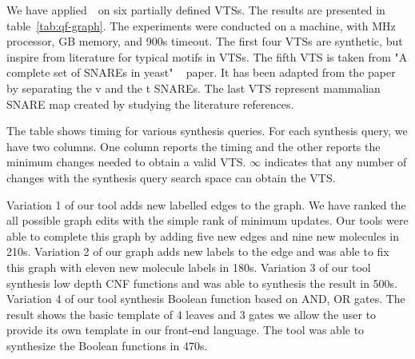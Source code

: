 We have applied~\ourtool~on six partially defined VTSs.
%
The results are presented in table~\ref{tab:qf-graph}.
%
The experiments were conducted on a machine,
with MHz processor, GB memory, and 900s timeout.
%
The first four VTSs are synthetic, but inspire from literature for
typical motifs in VTSs. 
%
%
The fifth VTS is taken from "A complete set of SNAREs in yeast"
~\cite{burri2004complete} paper. It has been adapted from the paper by
separating the v and the t SNAREs. 
%
The last VTS represent mammalian SNARE map created by studying the literature references.  

The table shows timing for various synthesis queries.
%
For each synthesis query, we have two columns.
%
One column reports the timing and the other reports the minimum changes
needed to obtain a valid VTS.
%
$\infty$ indicates that any number of changes with the synthesis query
search space can obtain the VTS.
%

Variation 1 of our tool adds new labelled edges to the graph.
%
We have ranked the all possible graph edits with the simple rank of
minimum updates.
%
Our tools were able to complete this graph by adding five new edges
and nine new molecules in 210s.
%
Variation 2 of our graph adds new labels to the edge and was able to
fix this graph with eleven new molecule labels in 180s.
%
Variation 3 of our tool synthesis low depth CNF functions and was able
to synthesis the result in 500s.
%
Variation 4 of our tool synthesis Boolean function based on AND, OR
gates.
%
The result shows the basic template of 4 leaves and 3 gates we allow
the user to provide its own template in our front-end language.
%
The tool was able to synthesize the Boolean functions in 470s.
%
%
%


